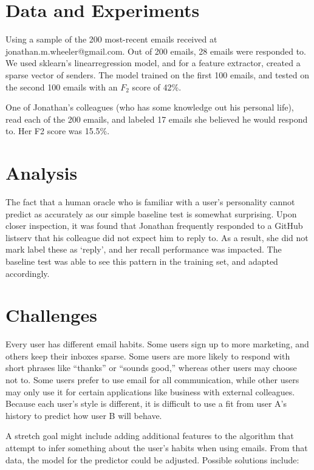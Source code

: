 \documentclass{article}
\begin{document}
\section{Data and Experiments}
Using a sample of the 200 most-recent emails received at jonathan.m.wheeler@gmail.com. Out of 200 emails, 28 emails were responded to. We used sklearn's linearregression model, and for a feature extractor, created a sparse vector of senders. The model trained on the first 100 emails, and tested on the second 100 emails with an $F_2$ score of 42\%. 

One of Jonathan's colleagues (who has some knowledge out his personal life), read each of the 200 emails, and labeled 17 emails she believed he would respond to. Her F2 score was 15.5\%.

\section{Analysis}
The fact that a human oracle who is familiar with a user's personality cannot predict as accurately as our simple baseline test is somewhat surprising. Upon closer inspection, it was found that Jonathan frequently responded to a GitHub listserv that his colleague did not expect him to reply to. As a result, she did not mark label these as `reply', and her recall performance was impacted. The baseline test was able to see this pattern in the training set, and adapted accordingly.

\section{Challenges}
Every user has different email habits. Some users sign up to more marketing, and others keep their inboxes sparse. Some users are more likely to respond with short phrases like ``thanks'' or ``sounds good,'' whereas other users may choose not to. Some users prefer to use email for all communication, while other users may only use it for certain applications like business with external colleagues. Because each user's style is different, it is difficult to use a fit from user A's history to predict how user B will behave.

A stretch goal might include adding additional features to the algorithm that attempt to infer something about the user's habits when using emails. From that data, the model for the predictor could be adjusted. Possible solutions include:
\end{document}
